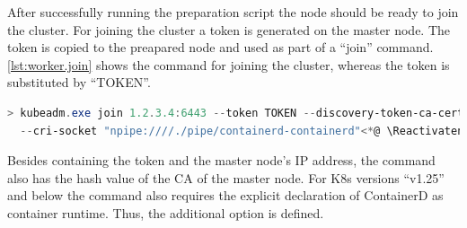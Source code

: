%
%



After successfully running the preparation script the node should be ready to join the cluster. For joining the cluster a token is generated on the master node. The token is copied to the preapared node and used as part of a \enquote{join} command. \autoref{lst:worker.join} shows the command for joining the cluster, whereas the token is substituted by \enquote{TOKEN}.
\begin{lstlisting}[label=lst:worker.join, caption={Command for joining new nodes on Windows}, language=PowerShell, morekeywords={kubeadm.exe}]
> kubeadm.exe join 1.2.3.4:6443 --token TOKEN --discovery-token-ca-cert-hash sha256:HASH \<*@ \Suppressnumber @*>
  --cri-socket "npipe:////./pipe/containerd-containerd"<*@ \Reactivatenumber @*>
\end{lstlisting}
Besides containing the token and the master node's \ac{IP} address, the command also has the hash value of the \ac{CA} of the master node. For \ac{K8s} versions \enquote{v1.25} and below the command also requires the explicit declaration of ContainerD as container runtime. Thus, the additional option  is defined.

